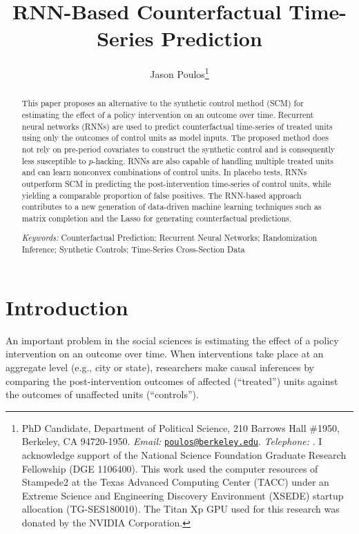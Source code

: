 \documentclass[hidelinks,12pt]{article}
\title{RNN-Based Counterfactual Time-Series Prediction}
\author[ ]{Jason Poulos\thanks{PhD Candidate, Department of Political Science, 210 Barrows Hall \#1950, Berkeley, CA 94720-1950. \emph{Email:} \href{mailto:poulos@berkeley.edu}{\nolinkurl{poulos@berkeley.edu}}. \emph{Telephone:} \Plus 1\Minus 510\Minus 642\Minus 6323. I acknowledge support of the National Science Foundation Graduate Research Fellowship (DGE 1106400). This work used the computer resources of Stampede2 at the Texas Advanced Computing Center (TACC) under an Extreme Science and Engineering Discovery Environment (XSEDE) startup allocation (TG-SES180010). The Titan Xp GPU used for this research was donated by the NVIDIA Corporation.}}
\affil[ ]{University of California, Berkeley}
\date{}
\begin{document}
 
 
\begin{singlespacing}
\maketitle  
\end{singlespacing}
\thispagestyle{empty}

\begin{abstract}  %
\noindent 
This paper proposes an alternative to the synthetic control method (SCM) for estimating the effect of a policy intervention on an outcome over time. Recurrent neural networks (RNNs) are used to predict counterfactual time-series of treated units using only the outcomes of control units as model inputs. The proposed method does not rely on pre-period covariates to construct the synthetic control and is consequently less susceptible to $p$-hacking. RNNs are also capable of handling multiple treated units and can learn nonconvex combinations of control units. In placebo tests, RNNs outperform SCM in predicting the post-intervention time-series of control units, while yielding a comparable proportion of false positives. The RNN-based approach contributes to a new generation of data-driven machine learning techniques such as matrix completion and the Lasso for generating counterfactual predictions.
\\
\begin{singlespace}
	\emph{Keywords:} Counterfactual Prediction; Recurrent Neural Networks; Randomization Inference; Synthetic Controls; Time-Series Cross-Section Data
\end{singlespace}
\end{abstract}

\pagebreak
{}%

\section{Introduction} 

An important problem in the social sciences is estimating the effect of a policy intervention on an outcome over time. When interventions take place at an aggregate level (e.g., city or state), researchers make causal inferences by comparing the post-intervention outcomes of affected (``treated'') units against the outcomes of unaffected units (``controls'').
\end{document}
